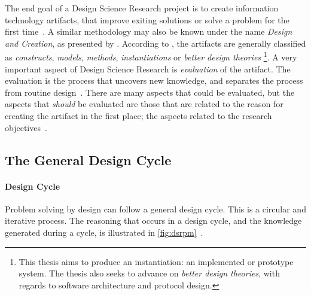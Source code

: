 The end goal of a Design Science Research project is to create information technology \glspl{artifact}, that improve exiting solutions or solve a problem for the first time~\cite[p.~6]{alanhevnerDesignResearchInformation2010}.
A similar methodology may also be known under the name \textit{Design and Creation}, as presented by \textcite[p.~108]{oatesResearchingInformationSystems2006}.
According to \textcite{alanhevnerDesignResearchInformation2010}, the artifacts are generally classified as \textit{constructs}, \textit{models}, \textit{methods}, \textit{instantiations} or \textit{better design theories}%
\label{par:artifact-classes}%
\footnote{This thesis aims to produce an instantiation: an implemented or prototype system. The thesis also seeks to advance on \textit{better design theories}, with regards to software architecture and protocol design.}.
A very important aspect of Design Science Research is \textit{evaluation} of the artifact.
The evaluation is the process that uncovers new knowledge, and separates the process from routine design~\cite[p.~7]{alanhevnerDesignResearchInformation2010}.
There are many aspects that could be evaluated, but the aspects that \textit{should} be evaluated are those that are related to the reason for creating the artifact in the first place; the aspects related to the research objectives~\cite[p.~115]{oatesResearchingInformationSystems2006}.



\subsection{The General Design Cycle }

\paragraph{Design Cycle}
Problem solving by design can follow a general design cycle.
This is a circular and iterative process.
The reasoning that occurs in a design cycle, and the knowledge generated during a cycle, is illustrated in \cref{fig:dsrpm}~\cite[p.~26]{alanhevnerDesignResearchInformation2010}.

